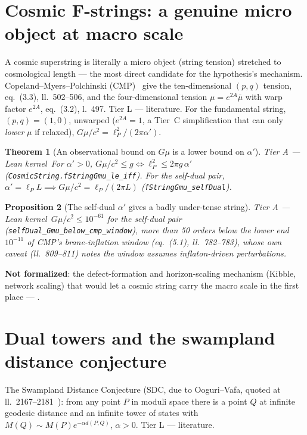 \documentclass[11pt,a4paper]{article}
\newtheorem{theorem}{Theorem}[section]
\newtheorem{proposition}[theorem]{Proposition}
\theoremstyle{remark}
\newcommand{\tierA}{\colorbox{green!15}{\textsf{\scriptsize Tier A --- Lean kernel}}}
\newcommand{\tierL}{\colorbox{blue!10}{\textsf{\scriptsize Tier L --- literature}}}
\begin{document}
\section{Cosmic F-strings: a genuine micro object at macro scale}
\label{sec:strings}
A cosmic superstring is literally a micro object (string tension) stretched to cosmological
length --- the most direct candidate for the hypothesis's mechanism. Copeland--Myers--Polchinski
(CMP)~\cite{CopelandMyersPolchinski2004} give the ten-dimensional $(p,q)$ tension, eq.~(3.3),
ll.~502--506, and the four-dimensional tension $\mu=e^{2A}\bar\mu$ with warp factor $e^{2A}$,
eq.~(3.2), l.~497. \tierL. For the fundamental string, $(p,q)=(1,0)$, unwarped ($e^{2A}=1$, a
Tier~C simplification that can only \emph{lower} $\mu$ if relaxed), $G\mu/c^2=\ell_P^2/(2\pi\alpha')$.

\begin{theorem}[An observational bound on $G\mu$ is a lower bound on $\alpha'$] \label{thm:gmu} \tierA\
For $\alpha'>0$, $G\mu/c^2\le g\iff\ell_P^2\le2\pi g\,\alpha'$
\textnormal{(}\texttt{CosmicString.fStringGmu\_le\_iff}\textnormal{)}. For the self-dual pair,
$\alpha'=\ell_P L\implies G\mu/c^2=\ell_P/(2\pi L)$
\textnormal{(}\texttt{fStringGmu\_selfDual}\textnormal{)}.
\end{theorem}

\begin{proposition}[The self-dual $\alpha'$ gives a badly under-tense string] \label{prop:cmpwindow} \tierA\
$G\mu/c^2\le10^{-61}$ for the self-dual pair
\textnormal{(}\texttt{selfDual\_Gmu\_below\_cmp\_window}\textnormal{)}, more than 50 orders below
the lower end $10^{-11}$ of CMP's brane-inflation window (eq.~(5.1), ll.~782--783), whose own
caveat (ll.~809--811) notes the window assumes inflaton-driven perturbations.
\end{proposition}
\textbf{Not formalized}: the defect-formation and horizon-scaling mechanism (Kibble, network
scaling) that would let a cosmic string carry the macro scale in the first place ---
\Cref{sec:outofscope}.

\section{Dual towers and the swampland distance conjecture}
\label{sec:towers}
The Swampland Distance Conjecture (SDC, due to Ooguri--Vafa, quoted at
ll.~2167--2181~\cite{PaltiReview2019}): from any point $P$ in moduli space there is a point $Q$ at
infinite geodesic distance and an infinite tower of states with $M(Q)\sim M(P)e^{-\alpha
d(P,Q)}$, $\alpha>0$. \tierL.
\end{document}
